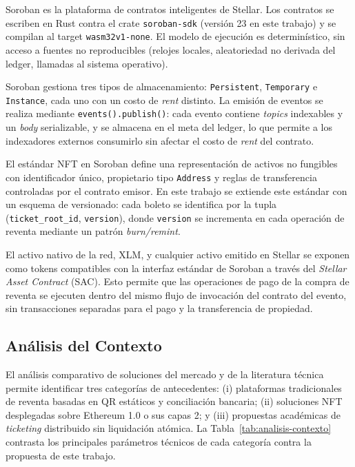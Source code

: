 Soroban es la plataforma de contratos inteligentes de Stellar. Los contratos se escriben en Rust contra el crate \texttt{soroban-sdk} (versión 23 en este trabajo) y se compilan al target \texttt{wasm32v1-none}. El modelo de ejecución es determinístico, sin acceso a fuentes no reproducibles (relojes locales, aleatoriedad no derivada del ledger, llamadas al sistema operativo).

Soroban gestiona tres tipos de almacenamiento: \texttt{Persistent}, \texttt{Temporary} e \texttt{Instance}, cada uno con un costo de \textit{rent} distinto. La emisión de eventos se realiza mediante \texttt{events().publish()}: cada evento contiene \textit{topics} indexables y un \textit{body} serializable, y se almacena en el meta del ledger, lo que permite a los indexadores externos consumirlo sin afectar el costo de \textit{rent} del contrato.

El estándar NFT en Soroban define una representación de activos no fungibles con identificador único, propietario tipo \texttt{Address} y reglas de transferencia controladas por el contrato emisor. En este trabajo se extiende este estándar con un esquema de versionado: cada boleto se identifica por la tupla (\texttt{ticket\_root\_id}, \texttt{version}), donde \texttt{version} se incrementa en cada operación de reventa mediante un patrón \textit{burn/remint}.

El activo nativo de la red, XLM, y cualquier activo emitido en Stellar se exponen como tokens compatibles con la interfaz estándar de Soroban a través del \textit{Stellar Asset Contract} (SAC). Esto permite que las operaciones de pago de la compra de reventa se ejecuten dentro del mismo flujo de invocación del contrato del evento, sin transacciones separadas para el pago y la transferencia de propiedad.

\subsection{Análisis del Contexto}

El análisis comparativo de soluciones del mercado y de la literatura técnica permite identificar tres categorías de antecedentes: (i) plataformas tradicionales de reventa basadas en QR estáticos y conciliación bancaria; (ii) soluciones NFT desplegadas sobre Ethereum 1.0 o sus capas 2; y (iii) propuestas académicas de \textit{ticketing} distribuido sin liquidación atómica. La Tabla~\ref{tab:analisis-contexto} contrasta los principales parámetros técnicos de cada categoría contra la propuesta de este trabajo.

